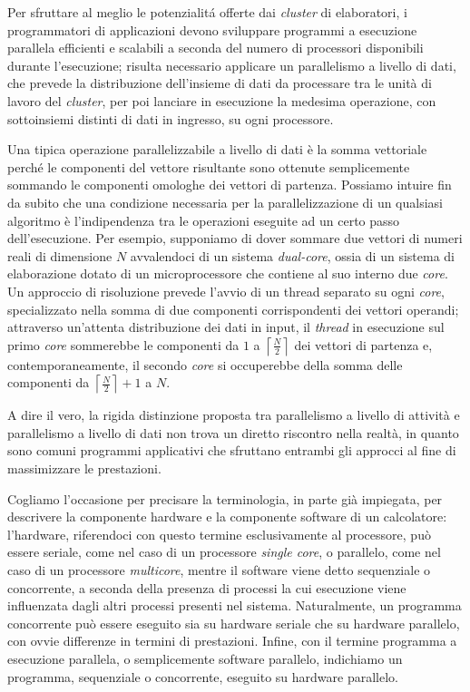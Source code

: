 Per sfruttare al meglio le potenzialit\'a offerte dai \textit{cluster} di elaboratori, i programmatori di applicazioni devono sviluppare programmi a esecuzione 
parallela efficienti e scalabili a seconda del numero di processori disponibili durante l'esecuzione; risulta necessario applicare un parallelismo a livello di 
dati, che prevede la distribuzione dell'insieme di dati da processare tra le unit\`a di lavoro del \textit{cluster}, per poi lanciare in esecuzione la 
medesima operazione, con sottoinsiemi distinti di dati in ingresso, su ogni processore.

Una tipica operazione parallelizzabile a livello di dati \`e la somma vettoriale perch\'e le componenti del vettore risultante sono ottenute
semplicemente sommando le componenti omologhe dei vettori di partenza. \newline
Possiamo intuire fin da subito che una condizione necessaria per la parallelizzazione di un qualsiasi algoritmo \`e l'indipendenza tra le operazioni eseguite ad un certo passo dell'esecuzione.\newline
Per esempio, supponiamo di dover sommare due vettori di numeri reali di dimensione $N$ avvalendoci di un sistema \textit{dual-core}, ossia di un sistema di elaborazione dotato di un microprocessore che contiene al suo interno
due \textit{core}.\newline
Un approccio di risoluzione prevede l'avvio di un thread separato su ogni \textit{core}, specializzato nella somma di due componenti corrispondenti dei vettori operandi; attraverso un'attenta distribuzione dei dati in input, il \textit{thread} in esecuzione sul primo \textit{core} sommerebbe le componenti da $1$ a $\left\lceil\frac{N}{2}\right\rceil$ dei vettori di partenza
e, contemporaneamente, il secondo \textit{core} si occuperebbe della somma delle componenti da $\left\lceil\frac{N}{2}\right\rceil + 1$ a $N$.

A dire il vero, la rigida distinzione proposta tra parallelismo a livello di attivit\`a e parallelismo a livello di dati non trova un diretto
riscontro nella realt\`a, in quanto sono comuni programmi applicativi che sfruttano entrambi gli approcci al fine di massimizzare le prestazioni.

Cogliamo l'occasione per precisare la terminologia, in parte gi\`a impiegata, per descrivere la componente hardware e la componente software di un calcolatore: l'hardware, riferendoci con questo termine esclusivamente al processore, pu\`o essere seriale, come nel caso di un processore \textit{single core}, o parallelo, come nel caso di un processore \textit{multicore}, mentre il software viene detto sequenziale o concorrente, a seconda della presenza di processi la cui esecuzione viene influenzata dagli altri processi presenti nel sistema.\newline
Naturalmente, un programma concorrente pu\`o essere eseguito sia su hardware seriale che su hardware parallelo, con ovvie differenze in termini di prestazioni.\newline
Infine, con il termine programma a esecuzione parallela, o semplicemente software parallelo, indichiamo un programma, sequenziale o concorrente, eseguito su hardware parallelo.